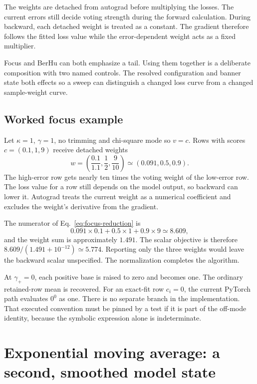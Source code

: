 \documentclass[10pt,aps,prd,twocolumn,nofootinbib]{revtex4-2}
\begin{document}
The weights are detached from autograd before multiplying the losses.  The
current errors still decide voting strength during the forward calculation.
During backward, each detached weight is treated as a constant.  The gradient
therefore follows the fitted loss value while the error-dependent weight acts
as a fixed multiplier.

Focus and BerHu can both emphasize a tail.  Using them together is a deliberate
composition with two named controls.  The resolved configuration and banner
state both effects so a sweep can distinguish a changed loss curve from
a changed sample-weight curve.

\subsection*{Worked focus example}

Let $\kappa=1$, $\gamma=1$, no trimming and chi-square mode so $v=c$.
Rows with scores $c=(0.1,1,9)$ receive
detached weights
\begin{equation*}
 w=\left(\frac{0.1}{1.1},\frac{1}{2},\frac{9}{10}\right)
 \simeq(0.091,0.5,0.9).
\end{equation*}
The high-error row gets nearly ten times the voting weight of the low-error
row.  The loss value for a row still depends on the model output, so backward
can lower it.  Autograd treats the current weight as a numerical coefficient
and excludes the weight's derivative from the gradient.

The numerator of Eq.~\eqref{eq:focus-reduction} is
\begin{equation*}
 0.091\times0.1+0.5\times1+0.9\times9\simeq8.609,
\end{equation*}
and the weight sum is approximately $1.491$.  The scalar objective is therefore
$8.609/(1.491+10^{-12})\simeq5.774$.  Reporting only the three weights would
leave the backward scalar unspecified.  The normalization completes the algorithm.

At $\gamma_+=0$, each positive base is raised to zero and becomes one.  The
ordinary retained-row mean is recovered.  For an exact-fit row $c_i=0$, the
current PyTorch path evaluates $0^0$ as one.  There is no separate branch in
the implementation.  That executed convention must be pinned by a test if it
is part of the off-mode identity, because the symbolic expression alone is
indeterminate.

\section{Exponential moving average: a second, smoothed model state}
\label{sec:ema}
\end{document}
